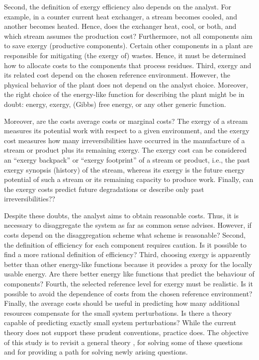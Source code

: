 \documentclass[energies,article,submit,moreauthors,pdftex]{Definitions/mdpi}
\begin{document}
Second, the definition of exergy efficiency also depends on the analyst. For example, in a counter current heat exchanger, a stream becomes cooled, and another becomes heated. Hence, does the exchanger heat, cool, or both, and which stream assumes the production cost? Furthermore, not all components aim to save exergy (productive components). Certain other components in a plant are responsible for mitigating (the exergy of) wastes. Hence, it must be determined how to allocate costs to the components that process residues.
Third, exergy and its related cost depend on the chosen reference environment. However, the physical behavior of the plant does not depend on the analyst choice. Moreover, the right choice of the energy-like function for describing the plant might be in doubt: energy, exergy, (Gibbs) free energy, or any other generic function.

Moreover, are the costs average costs or marginal costs? The exergy of a stream measures its potential work with respect to a given environment, and the exergy cost measures how many irreversibilities have occurred in the manufacture of a stream or product plus its remaining exergy. The exergy cost can be considered an “exergy backpack” or “exergy footprint” of a stream or product, i.e., the past exergy synopsis (history) of the stream, whereas its exergy is the future energy potential of such a stream or its remaining capacity to produce work. Finally, can the exergy costs predict future degradations or describe only past irreversibilities??

Despite these doubts, the analyst aims to obtain reasonable costs. Thus, it is necessary to disaggregate the system as far as common sense advises. However, if costs depend on the disaggregation scheme what scheme is reasonable? Second, the definition of efficiency for each component requires caution. Is it possible to find a more rational definition of efficiency? Third, choosing exergy is apparently better than other energy-like functions because it provides a proxy for the locally usable energy. Are there better energy like functions that predict the behaviour of components? Fourth, the selected reference level for exergy must be realistic. Is it possible to avoid the dependence of costs from the chosen reference environment? Finally, the average costs should be useful in predicting how many additional resources compensate for the small system perturbations. Is there a theory capable of predicting  exactly small system perturbations? While the current theory does not support these prudent conventions, practice does. The objective of this study is to revisit a general theory \cite{Valero1992a,Valero1992b}, for solving some of these questions and for providing a path for solving newly arising questions.
\end{document}
